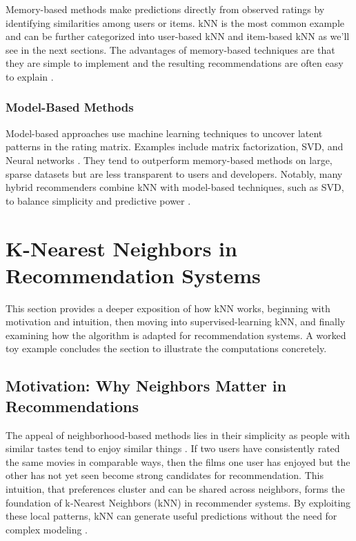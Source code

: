 \documentclass[
  12pt]{article}
\begin{document}
Memory-based methods make predictions directly from observed ratings by
identifying similarities among users or items. kNN is the most common
example and can be further categorized into user-based kNN and
item-based kNN as we'll see in the next sections. The advantages of
memory-based techniques are that they are simple to implement and the
resulting recommendations are often easy to explain
\citep{aggarwal2016}.

\subsubsection{\texorpdfstring{\textbf{Model-Based
Methods}}{Model-Based Methods}}\label{model-based-methods}

Model-based approaches use machine learning techniques to uncover latent
patterns in the rating matrix. Examples include matrix factorization,
SVD, and Neural networks \citep{apxml2025}. They tend to outperform
memory-based methods on large, sparse datasets but are less transparent
to users and developers. Notably, many hybrid recommenders combine kNN
with model-based techniques, such as SVD, to balance simplicity and
predictive power \citep{hssina2021}.

\section{K-Nearest Neighbors in Recommendation
Systems}\label{k-nearest-neighbors-in-recommendation-systems}

This section provides a deeper exposition of how kNN works, beginning
with motivation and intuition, then moving into supervised-learning kNN,
and finally examining how the algorithm is adapted for recommendation
systems. A worked toy example concludes the section to illustrate the
computations concretely.

\subsection{\texorpdfstring{\textbf{Motivation:} Why Neighbors Matter in
Recommendations}{Motivation: Why Neighbors Matter in Recommendations}}\label{motivation-why-neighbors-matter-in-recommendations}

The appeal of neighborhood‑based methods lies in their simplicity as
people with similar tastes tend to enjoy similar things
\citep{nikolakopoulos2021}. If two users have consistently rated the
same movies in comparable ways, then the films one user has enjoyed but
the other has not yet seen become strong candidates for recommendation.
This intuition, that preferences cluster and can be shared across
neighbors, forms the foundation of k‑Nearest Neighbors (kNN) in
recommender systems. By exploiting these local patterns, kNN can
generate useful predictions without the need for complex modeling
\citep{nikolakopoulos2021}.
\end{document}
